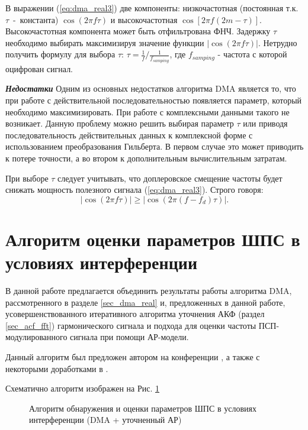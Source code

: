 В выражении (\ref{eq:dma_real3}) две компоненты: низкочастотная (постоянная т.к. \mbox{${\tau}$ - константа})  ${\cos (2\pi f \tau)}$ и высокочастотная ${\cos \left[2 \pi f (2m - \tau)\right]}$. Высокочастотная компонента
может быть отфильтрована ФНЧ. Задержку ${\tau}$ необходимо выбирать максимизируя значение функции ${\left| \cos (2\pi f \tau) \right|}$.
Нетрудно получить формулу для выбора ${\tau}$: ${\tau = \frac{1}{f} / \frac{1}{f_{samping}}}$,
где ${f_{samping}}$ - частота с которой оцифрован сигнал.

{\bf{\textit{Недостатки}}}
Одним из основных недостатков алгоритма DMA является то, что при работе с действительной последовательностью появляется параметр, который
необходимо максимизировать. При работе с комплексными данными такого не возникает. Данную проблему можно решить выбирая параметр ${\tau}$ или приводя последовательность
действительных данных к комплексной форме с использованием преобразования Гильберта. В первом случае это может приводить к потере точности, а во втором к дополнительным
вычислительным затратам.

При выборе ${\tau}$ следует учитывать, что доплеровское смещение частоты будет снижать мощность полезного сигнала (\ref{eq:dma_real3}). Строго говоря:
\begin{equation}
	\left| \cos (2\pi f \tau) \right| \ge \left| \cos (2\pi (f - f_d) \tau) \right|.
\end{equation}

\section{Алгоритм оценки параметров ШПС в условиях интерференции}
\label{l:ssec3_dma_lpc_algo}

В данной работе предлагается объединить результаты работы алгоритма DMA, рассмотренного в разделе
\ref{sec_dma_real} и, предложенных в данной работе, усовершенствованного итеративного 
алгоритма уточнения АКФ (раздел \ref{sec_acf_fft}) гармонического сигнала и 
подхода для оценки частоты ПСП-модулированного сигнала при помощи АР-модели.

Данный алгоритм был предложен автором на конференции \cite{my_dma_ar}, а также с некоторыми доработками в \cite{my_otchet}.

Схематично алгоритм изображен на Рис. \ref{pic4:dma_quadruple_lpc}

\begin{figure}[h]
\center{}
	\caption{Алгоритм обнаружения и оценки параметров ШПС в условиях интерференции (DMA + уточненный АР)}
	\label{pic4:dma_quadruple_lpc}
\end{figure}


